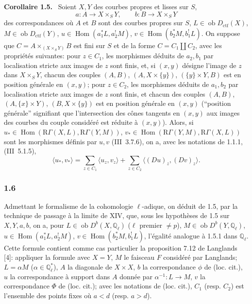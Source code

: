 \documentclass[11pt]{article}
\newenvironment{statement}[1]{\par\medskip\noindent\textbf{#1.}\ }{\par\medskip}
\DeclareMathOperator{\Hom}{Hom}
\newcommand{\R}{\mathrm{R}}\newcommand{\RHomCore}{\mathrm{RHom}}
\newcommand{\ob}{\operatorname{ob}}
\providecommand{\ctf}{\mathrm{ctf}}
\providecommand{\Hom}{\operatorname{Hom}}
\providecommand{\ob}{\operatorname{ob}}
\providecommand{\R}{\mathrm R}
\providecommand{\Hom}{\operatorname{Hom}}
\begin{document}
\begin{statement}{Corollaire 1.5}
Soient $X,Y$ des courbes propres et lisses sur $S$,
\[
a:A\longrightarrow X\times_S Y,
\qquad
b:B\longrightarrow X\times_S Y
\]
des correspondances où $A$ et $B$ sont des courbes propres sur $S$, $L\in\ob D_{\ctf}(X)$, $M\in\ob D_{\ctf}(Y)$, $u\in\Hom(a_1^*L,a_2^!M)$, $v\in\Hom(b_2^*M,b_1^!L)$. On suppose que $C=A\times_{(X\times_S Y)}B$ est fini sur $S$ et de la forme $C=C_1\amalg C_2$, avec les propriétés suivantes: pour $z\in C_1$, les morphismes déduits de $a_2,b_1$ par localisation stricte aux images de $z$ sont finis, et, si $(x,y)$ désigne l'image de $z$ dans $X\times_S Y$, chacun des couples $(A,B)$, $(A,X\times\{y\})$, $(\{y\}\times Y,B)$ est en position générale en $(x,y)$; pour $z\in C_2$, les morphismes déduits de $a_1,b_2$ par localisation stricte aux images de $z$ sont finis, et chacun des couples $(A,B)$, $(A,\{x\}\times Y)$, $(B,X\times\{y\})$ est en position générale en $(x,y)$ (``position générale'' signifiant que l'intersection des cônes tangents en $(x,y)$ aux images des courbes du couple considéré est réduite à $(x,y)$). Alors, si $u_*\in\Hom(\R\Gamma(X,L),\R\Gamma(Y,M))$, $v_*\in\Hom(\R\Gamma(Y,M),\R\Gamma(X,L))$ sont les morphismes définis par $u,v$ (III~3.7.6), on a, avec les notations de 1.1.1, (III~5.1.5),
\begin{equation}\tag{1.5.1}
\langle u_*,v_*\rangle=\sum_{z\in C_1}\langle u_z,v_z\rangle+\sum_{z\in C_2}\langle (Du)_z,(Dv)_z\rangle.
\end{equation}
\end{statement}

\subsubsection*{1.6}
Admettant le formalisme de la cohomologie $\ell$-adique, on déduit de 1.5, par la technique de passage à la limite de XIV, que, sous les hypothèses de 1.5 sur $X,Y,a,b$, on a, pour $L\in\ob D^b(X,\mathbb Q_\ell)$ ($\ell$ premier $\ne p$), $M\in\ob D^b(Y,\mathbb Q_\ell)$, $u\in\Hom(a_1^*L,a_2^!M)$, $v\in\Hom(b_2^*M,b_1^!L)$, l'égalité analogue à 1.5.1 dans $\mathbb Q_\ell$. Cette formule contient comme cas particulier la proposition 7.12 de Langlands [4]: appliquer la formule avec $X=Y$, $M$ le faisceau $F$ considéré par Langlands; $L=\alpha M$ ($\alpha\in\mathbb Q_\ell^*$), $A$ la diagonale de $X\times X$, $b$ la correspondance $\phi$ de (loc. cit.), $u$ la correspondance à support dans $A$ donnée par $\alpha^{-1}:L\to M$, $v$ la correspondance $\Phi$ de (loc. cit.); avec les notations de (loc. cit.), $C_1$ (resp. $C_2$) est l'ensemble des points fixes où $a<d$ (resp. $a>d$).
\end{document}
